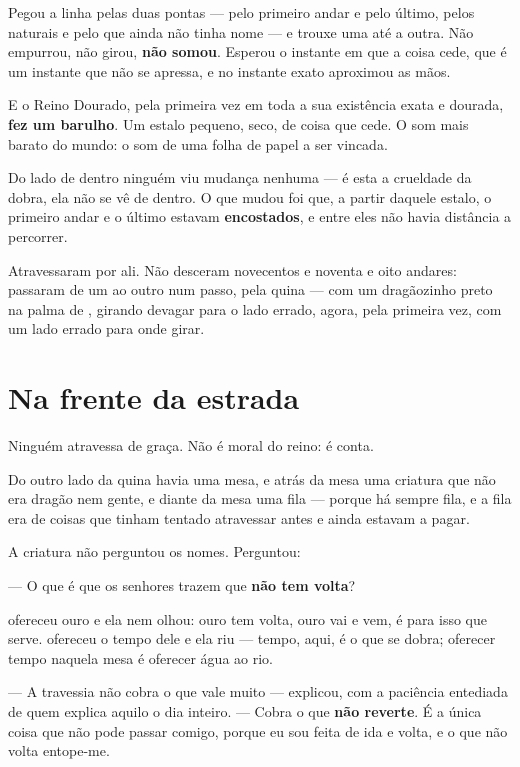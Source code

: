 \documentclass[livro.tex]{subfiles}
\begin{document}
\medskip

Pegou a linha pelas duas pontas --- pelo primeiro andar e pelo último, pelos naturais e pelo que ainda
não tinha nome --- e trouxe uma até a outra. Não empurrou, não girou, \textbf{não somou}. Esperou
o instante em que a coisa cede, que é um instante que não se apressa, e no instante exato
aproximou as mãos.

E o Reino Dourado, pela primeira vez em toda a sua existência exata e dourada, \textbf{fez um
barulho}. Um estalo pequeno, seco, de coisa que cede. O som mais barato do mundo: o som de uma
folha de papel a ser vincada.

Do lado de dentro ninguém viu mudança nenhuma --- é esta a crueldade da dobra, ela não se vê de
dentro. O que mudou foi que, a partir daquele estalo, o primeiro andar e o último estavam
\textbf{encostados}, e entre eles não havia distância a percorrer.

Atravessaram por ali. Não desceram novecentos e noventa e oito andares: passaram de um ao outro
num passo, pela quina --- com um dragãozinho preto na palma de \Joa , girando devagar para o lado
errado, agora, pela primeira vez, com um lado errado para onde girar.

\chapter{Na frente da estrada}

Ninguém atravessa de graça. Não é moral do reino: é conta.

Do outro lado da quina havia uma mesa, e atrás da mesa uma criatura que não era dragão nem gente,
e diante da mesa uma fila --- porque há sempre fila, e a fila era de coisas que tinham tentado
atravessar antes e ainda estavam a pagar.

A criatura não perguntou os nomes. Perguntou:

--- O que é que os senhores trazem que \textbf{não tem volta}?

\Yas ofereceu ouro e ela nem olhou: ouro tem volta, ouro vai e vem, é para isso que serve. \Ben
ofereceu o tempo dele e ela riu --- tempo, aqui, é o que se dobra; oferecer tempo naquela mesa é
oferecer água ao rio.

--- A travessia não cobra o que vale muito --- explicou, com a paciência entediada de quem
explica aquilo o dia inteiro. --- Cobra o que \textbf{não reverte}. É a única coisa que não pode
passar comigo, porque eu sou feita de ida e volta, e o que não volta entope-me.
\end{document}
